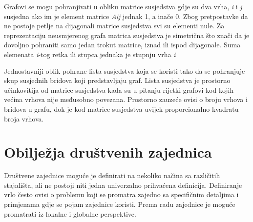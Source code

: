 Grafovi se mogu pohranjivati u obliku matrice susjedstva gdje su dva vrha, \textit{i} i \textit{j} susjedna ako im je element matrice \textit{A{ij}} jednak 1, a inače 0. Zbog pretpostavke da ne postoje petlje na dijagonali matrice susjedstva svi su elementi nule. Za reprezentaciju neusmjerenog grafa matrica susjedstva je simetrična što znači da je dovoljno pohraniti samo jedan trokut matrice, iznad ili ispod dijagonale. Suma elemenata \textit{i}-tog retka ili stupca jednaka je stupnju vrha \textit{i}

Jednostavniji oblik pohrane lista susjedstva koja se koristi tako da se pohranjuje skup susjednih bridova koji predstavljaju graf. Lista susjedstva je prostorno učinkovitija od matrice susjedstva kada su u pitanju rijetki grafovi kod kojih većina vrhova nije međusobno povezana. Prostorno zauzeće ovisi o broju vrhova i bridova u grafu, dok je kod matrice susjedstva uvijek proporcionalno kvadratu broja vrhova.


\section{Obilježja društvenih zajednica} 

Društvene zajednice moguće je definirati na nekoliko načina sa različitih stajališta, ali ne postoji niti jedna univerzalno prihvaćena definicija. Definiranje vrlo često ovisi o problemu koji se promatra zajedno sa specifičnim detaljima i primjenama gdje se pojam zajednice koristi. Prema radu \cite{fortunato2010community} zajednice je moguće promatrati iz lokalne i globalne perspektive.

